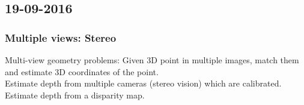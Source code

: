 \subsection{19-09-2016}
\subsubsection{Multiple views: Stereo}
Multi-view geometry problems: Given 3D point in multiple images, match them and estimate 3D coordinates of the point.\\
Estimate depth from multiple cameras (stereo vision) which are calibrated.\\
Estimate depth from a disparity map.